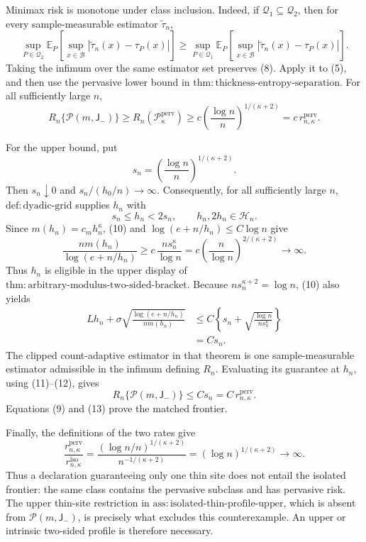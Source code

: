 Minimax risk is monotone under class inclusion. Indeed, if \(\mathcal Q_1\subseteq\mathcal Q_2\), then for every sample-measurable estimator \(\widetilde\tau_n\),
\[
 \sup_{P\in\mathcal Q_2}\mathbb E_P\!\left[\sup_{x\in\mathcal B}|\widetilde\tau_n(x)-\tau_P(x)|\right]
 \ge
 \sup_{P\in\mathcal Q_1}\mathbb E_P\!\left[\sup_{x\in\mathcal B}|\widetilde\tau_n(x)-\tau_P(x)|\right]. \tag{8}
\]
Taking the infimum over the same estimator set preserves (8). Apply it to (5), and then use the pervasive lower bound in \(\mathrm{thm:thickness\text{-}entropy\text{-}separation}\). For all sufficiently large \(n\),
\[
 R_n\{\mathcal P(m,\mathsf J_{-})\}\ge R_n(\mathcal P_{\kappa}^{\mathrm{perv}})
 \ge c\left(\frac{\log n}{n}\right)^{1/(\kappa+2)}
 =c\,r_{n,\kappa}^{\mathrm{perv}}. \tag{9}
\]

For the upper bound, put
\[
 s_n=\left(\frac{\log n}{n}\right)^{1/(\kappa+2)}.
\]
Then \(s_n\downarrow0\) and \(s_n/(h_0/n)\to\infty\). Consequently, for all sufficiently large \(n\), \(\mathrm{def:dyadic\text{-}grid}\) supplies \(h_n\) with
\[
 s_n\le h_n<2s_n,\qquad h_n,2h_n\in\mathcal H_n. \tag{10}
\]
Since \(m(h_n)=c_mh_n^\kappa\), (10) and \(\log(e+n/h_n)\le C\log n\) give
\[
 \frac{nm(h_n)}{\log(e+n/h_n)}
 \ge c\,\frac{ns_n^\kappa}{\log n}
 =c\left(\frac n{\log n}\right)^{2/(\kappa+2)}
 \longrightarrow\infty. \tag{11}
\]
Thus \(h_n\) is eligible in the upper display of \(\mathrm{thm:arbitrary\text{-}modulus\text{-}two\text{-}sided\text{-}bracket}\). Because \(ns_n^{\kappa+2}=\log n\), (10) also yields
\[
 \begin{aligned}
 Lh_n+\sigma\sqrt{\frac{\log(e+n/h_n)}{nm(h_n)}}
 &\le C\left\{s_n+\sqrt{\frac{\log n}{ns_n^\kappa}}\right\}\\
 &=Cs_n.
 \end{aligned}\tag{12}
\]
The clipped count-adaptive estimator in that theorem is one sample-measurable estimator admissible in the infimum defining \(R_n\). Evaluating its guarantee at \(h_n\), using (11)--(12), gives
\[
 R_n\{\mathcal P(m,\mathsf J_{-})\}\le Cs_n
 =C\,r_{n,\kappa}^{\mathrm{perv}}. \tag{13}
\]
Equations (9) and (13) prove the matched frontier.

Finally, the definitions of the two rates give
\[
 \frac{r_{n,\kappa}^{\mathrm{perv}}}{r_{n,\kappa}^{\mathrm{iso}}}
 =\frac{(\log n/n)^{1/(\kappa+2)}}{n^{-1/(\kappa+2)}}
 =(\log n)^{1/(\kappa+2)}\longrightarrow\infty. \tag{14}
\]
Thus a declaration guaranteeing only one thin site does not entail the isolated frontier: the same class contains the pervasive subclass and has pervasive risk. The upper thin-site restriction in \(\mathrm{ass:isolated\text{-}thin\text{-}profile\text{-}upper}\), which is absent from \(\mathcal P(m,\mathsf J_{-})\), is precisely what excludes this counterexample. An upper or intrinsic two-sided profile is therefore necessary.